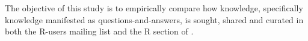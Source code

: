 



The objective of this study is to empirically compare how knowledge, specifically knowledge manifested as questions-and-answers, is sought, shared and curated in
both the R-users mailing list and the R section of \SO.




